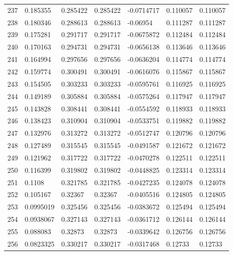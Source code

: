 \begin{longtable}{l|lll|lll}
 237 &  0.185355    & 0.285422    & 0.285422    & -0.0714717   & 0.110057    & 0.110057    \\
 238 &  0.180346    & 0.288613    & 0.288613    & -0.06954     & 0.111287    & 0.111287    \\
 239 &  0.175281    & 0.291717    & 0.291717    & -0.0675872   & 0.112484    & 0.112484    \\
 240 &  0.170163    & 0.294731    & 0.294731    & -0.0656138   & 0.113646    & 0.113646    \\
 241 &  0.164994    & 0.297656    & 0.297656    & -0.0636204   & 0.114774    & 0.114774    \\
 242 &  0.159774    & 0.300491    & 0.300491    & -0.0616076   & 0.115867    & 0.115867    \\
 243 &  0.154505    & 0.303233    & 0.303233    & -0.0595761   & 0.116925    & 0.116925    \\
 244 &  0.149189    & 0.305884    & 0.305884    & -0.0575264   & 0.117947    & 0.117947    \\
 245 &  0.143828    & 0.308441    & 0.308441    & -0.0554592   & 0.118933    & 0.118933    \\
 246 &  0.138423    & 0.310904    & 0.310904    & -0.0533751   & 0.119882    & 0.119882    \\
 247 &  0.132976    & 0.313272    & 0.313272    & -0.0512747   & 0.120796    & 0.120796    \\
 248 &  0.127489    & 0.315545    & 0.315545    & -0.0491587   & 0.121672    & 0.121672    \\
 249 &  0.121962    & 0.317722    & 0.317722    & -0.0470278   & 0.122511    & 0.122511    \\
 250 &  0.116399    & 0.319802    & 0.319802    & -0.0448825   & 0.123314    & 0.123314    \\
 251 &  0.1108      & 0.321785    & 0.321785    & -0.0427235   & 0.124078    & 0.124078    \\
 252 &  0.105167    & 0.32367     & 0.32367     & -0.0405516   & 0.124805    & 0.124805    \\
 253 &  0.0995019   & 0.325456    & 0.325456    & -0.0383672   & 0.125494    & 0.125494    \\
 254 &  0.0938067   & 0.327143    & 0.327143    & -0.0361712   & 0.126144    & 0.126144    \\
 255 &  0.088083    & 0.32873     & 0.32873     & -0.0339642   & 0.126756    & 0.126756    \\
 256 &  0.0823325   & 0.330217    & 0.330217    & -0.0317468   & 0.12733     & 0.12733     \\

\end{longtable}
